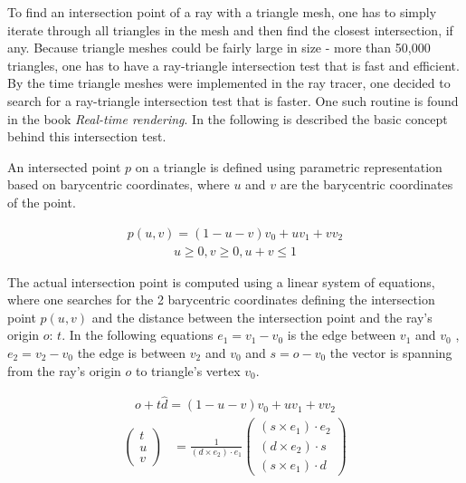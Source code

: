 \documentclass{article}
\begin{document}
To find an intersection point of a ray with a triangle mesh, one has to simply iterate through all triangles in the mesh and then find the closest intersection, if any. Because triangle meshes could be fairly large in size - more than 50,000 triangles, one has to have a ray-triangle intersection test that is fast and efficient. By the time triangle meshes were implemented in the ray tracer, one decided to search for a ray-triangle intersection test that is faster. One such routine is found in the book \textit{Real-time rendering}.  \cite{realtime_ren} \citep{fast_triangle_isect} In the following is described the basic concept behind this intersection test. 

\vspace*{\baselineskip}

An intersected point $p$ on a triangle is defined using parametric representation based on barycentric coordinates, where $u$ and $v$ are the barycentric coordinates of the point.

\begin{align}
	p(u, v) = (1 - u - v)v_{0} + uv_{1} + vv_{2}
\end{align}
\begin{align}
	u \geq 0, v \geq 0, u + v \leq 1
\end{align}

The actual intersection point is computed using a linear system of equations, where one searches for the 2 barycentric coordinates defining the intersection point $p(u, v)$ and the distance between the intersection point and the ray's origin $o$: $t$. In the following equations $e_{1} = v_{1} - v_{0}$ is the edge between $v_{1}$ and $v_{0}$ , $e_{2} = v_{2} - v_{0}$ the edge is between $v_{2}$ and $v_{0}$ and $s = o - v_{0}$ the vector is spanning from the ray's origin $o$ to triangle's vertex $v_{0}$.

\begin{align}
	o + t\hat{d} = (1 - u - v)v_{0} + uv_{1} + vv_{2}
\end{align}
\begin{align}
	\begin{pmatrix}
	t \\
	u \\
	v
	\end{pmatrix} &= \frac{1}{(d \times e_{2}) \cdot e_{1}}
	\begin{pmatrix}
	(s \times e_{1}) \cdot e_{2} \\
	(d \times e_{2}) \cdot s \\
	(s \times e_{1}) \cdot d
	\end{pmatrix}
\end{align}
\end{document}
